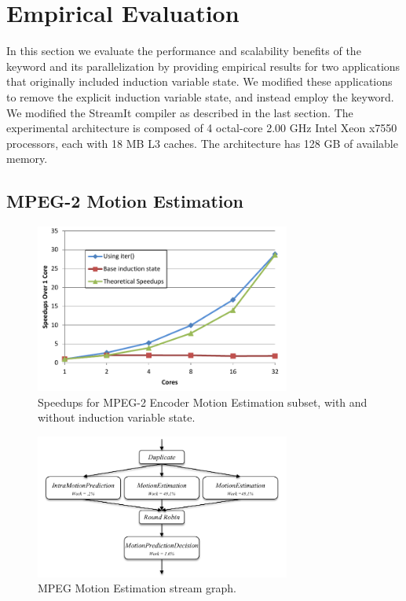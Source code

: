 \section{Empirical Evaluation}
\label{sec:analysis}

In this section we evaluate the performance and scalability benefits
of the \iter keyword and its parallelization by providing empirical
results for two applications that originally included induction
variable state. We modified these applications to remove the explicit
induction variable state, and instead employ the \iter keyword. We
modified the StreamIt compiler as described in the last section.  The
experimental architecture is composed of 4 octal-core 2.00 GHz Intel
Xeon x7550 processors, each with 18 MB L3 caches. The architecture has
128 GB of available memory.

\subsection{MPEG-2 Motion Estimation}
\label{sec:mpeg}


\begin{figure}[t]
\includegraphics[width=3.3in]{figures/mpeg-results.pdf}
\caption{Speedups for MPEG-2 Encoder Motion Estimation subset, with and without induction variable state.  \protect\label{fig:mpeg-results}}
\vspace{-10pt}
\end{figure}


\begin{figure}[t]
\includegraphics[width=3.3in]{figures/work_estimate_mpeg_motionestimation.pdf}
\caption{MPEG Motion Estimation stream graph.\protect\label{fig:mpegMEgraph}}
\end{figure}


